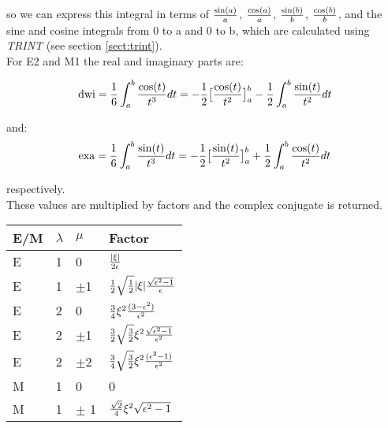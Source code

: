\noindent so we can express this integral in terms of ${\sin(a) \over a}$,
${\cos(a) \over a}$, ${\sin(b) \over b}$, ${\cos(b) \over b}$, and the sine
and cosine integrals from 0 to a and 0 to b, which are calculated using {\em
TRINT} (see section \ref{sect:trint}).\\

\noindent For E2 and M1 the real and imaginary parts are:

\begin{equation}
\mathrm{dwi} = {1 \over 6} \int_a^b {\cos(t) \over t^3} dt =
- {1 \over 2} \big[{\cos(t) \over t^2} \big]_a^b
-  {1 \over 2} \int_a^b {\sin(t) \over t^2} dt
\end{equation}

\noindent and:\\

\begin{equation}
\mathrm{exa} = {1 \over 6} \int_a^b {\sin(t) \over t^3} dt =
-{1 \over 2} \big[{\sin(t) \over t^2} \big]_a^b
+ {1 \over 2} \int_a^b {\cos(t) \over t^2} dt
\end{equation}

\noindent respectively.\\

\noindent These values are multiplied by factors and the complex conjugate
is returned.\\

\begin{center}
\begin{tabular}{|llll|}
\hline
E/M & $\lambda$ & $\mu$ & Factor\\
\hline
E & 1 & 0 & ${|\xi| \over 2 \epsilon}$\\
E & 1 & $\pm$1 & ${1\over 2}\sqrt{1 \over 2} |\xi| {\sqrt{\epsilon^2 - 1} 
\over \epsilon}$\\
E & 2 & 0 & ${3 \over 4} \xi^2 {(3 - \epsilon^2) \over \epsilon^2}$\\
E & 2 & $\pm$1 & ${3 \over 2} \sqrt{3 \over 2} \xi^2 {\sqrt{\epsilon^2 - 1} \over
\epsilon^2}$\\
E & 2 & $\pm$2 & ${3 \over 4} \sqrt{3 \over 2} \xi^2 {(\epsilon^2 - 1) \over
\epsilon^2}$\\
M & 1 & 0 & 0\\
M & 1 & $\pm$ 1 & ${\sqrt{2} \over 4} \xi^2 \sqrt{\epsilon^2 - 1}$\\
\hline
\end{tabular}
\end{center}
